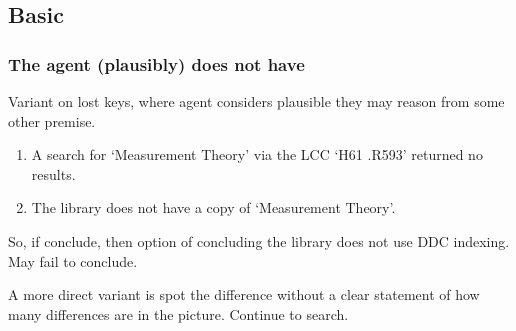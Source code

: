 \subsection{Basic }
\label{cha:zS:sec:question:illu:basic}

\subsubsection{The agent (plausibly) does not have \zS{}}
\label{cha:zS:sec:question:illu:basic:does-not-have}

\begin{note}
  Variant on lost keys, where agent considers plausible they may reason from some other premise.
  {
    \color{red}
    \begin{illustration}
      \begin{enumerate}
      \item
        A search for `Measurement Theory' via the LCC `H61 .R593' returned no results.
      \item
        The library does not have a copy of `Measurement Theory'.
      \end{enumerate}
    \end{illustration}

    So, if conclude, then option of concluding the library does not use DDC indexing.
    May fail to conclude.
  }

  A more direct variant is spot the difference without a clear statement of how many differences are in the picture.
  Continue to search.
\end{note}

